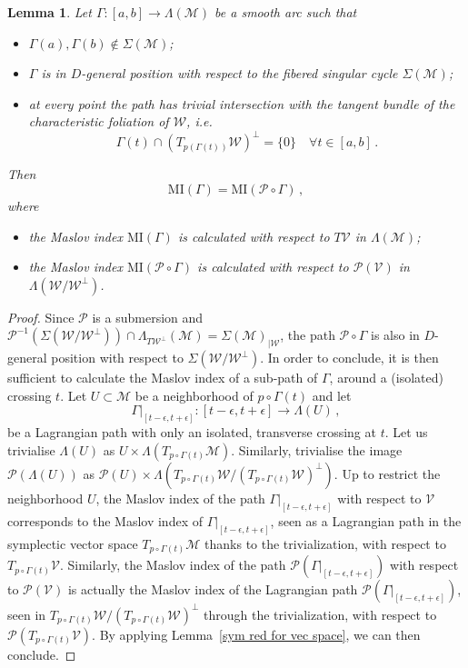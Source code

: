 \documentclass[10pt,a4paper]{amsart}
\numberwithin{equation}{section}
\renewcommand*\P{\mathcal{P}}
\newcommand*\M{\mathcal{M}}
\newcommand*\cw{\mathcal{W}}
\newcommand*\cv{\mathcal{V}}
\newcommand*\cal{\mathcal}
\newcommand{\MI}{\mathrm{MI}}
\let\oldforall\forall
\renewcommand*{\forall}{\mathrel{\oldforall}}
\newtheorem{lemm}[theo]{Lemma}
\theoremstyle{definition}
\theoremstyle{remark}
\begin{document}
\break
\begin{lemm}\label{lemma almost Viterbo}
Let $\Gamma:[a,b]\to \Lambda(\M)$ be a smooth arc such that
\begin{itemize}
\item $\Gamma(a),\Gamma(b)\notin \Sigma(\M)$;
\item {$\Gamma$ is in $D$-general position with respect to the fibered singular cycle $\Sigma(\M)$;}
\item at every point the path has trivial intersection with the tangent bundle of the characteristic foliation of $\cal W$, i.e.
\[
\Gamma(t)\cap \left(T_{p(\Gamma(t))}\cal W\right)^\perp=\{0\}\quad\forall t\in[a,b]\,.
\]
\end{itemize}
Then
\[
\MI(\Gamma)= \MI(\P\circ\Gamma)\,,
\]
where
\begin{itemize}
\item the Maslov index $ \MI(\Gamma)$ is calculated with respect to $T\cal V$ in $\Lambda(\M)$;
\item the Maslov index $ \MI(\P\circ\Gamma)$ is calculated with respect to $\P(\cal V)$ in $
\Lambda(\cal W/\cal W^\bot)$.
\end{itemize}
\end{lemm}

\begin{proof}
Since $\P$ is a submersion and $\P^{-1}(\Sigma(\cal W/\cal W^\bot))\cap \Lambda_{T\cal W^\bot}(\M)=\Sigma(\M)_{|\cal W}$, the path $\P\circ\Gamma$ is also in $D$-general position with respect to $\Sigma(\cal W/\cal W^\bot)$. In order to conclude, it is then sufficient to calculate the Maslov index of a sub-path of $\Gamma$, around a (isolated) crossing $t$. Let $U\subset\M$ be a neighborhood of $p\circ\Gamma(t)$ and let
\[
\Gamma\vert_{[t-\epsilon,t+\epsilon]}:[t-\epsilon,t+\epsilon]\to \Lambda(U)\,,
\]
be a Lagrangian path with only an isolated, transverse crossing at $t$. Let us trivialise $\Lambda(U)$ as $U\times \Lambda(T_{p\circ\Gamma(t)}\M)$. Similarly, trivialise the image $\P(\Lambda(U))$ as $\P(U)\times \Lambda(T_{p\circ\Gamma(t)}\cw/(T_{p\circ\Gamma(t)}\cw)^\perp)$. Up to restrict the neighborhood $U$, the Maslov index of the path $\Gamma\vert_{[t-\epsilon,t+\epsilon]}$ with respect to $\cv$ corresponds to the Maslov index of $\Gamma\vert_{[t-\epsilon,t+\epsilon]}$, seen as a Lagrangian path in the symplectic vector space $T_{p\circ\Gamma(t)}\M$ thanks to the trivialization, with respect to $T_{p\circ\Gamma(t)}\cv$. Similarly, the Maslov index of the path $\P(\Gamma\vert_{[t-\epsilon,t+\epsilon]})$ with respect to $\P(\cv)$ is actually the Maslov index of the Lagrangian path $\P(\Gamma\vert_{[t-\epsilon,t+\epsilon]})$, seen in $T_{p\circ\Gamma(t)}\cw/(T_{p\circ\Gamma(t)}\cw)^\perp$ through the trivialization, with respect to $\P(T_{p\circ\Gamma(t)}\cv)$. By applying Lemma~\ref{sym red for vec space}, we can then conclude.
\end{proof}
\end{document}
